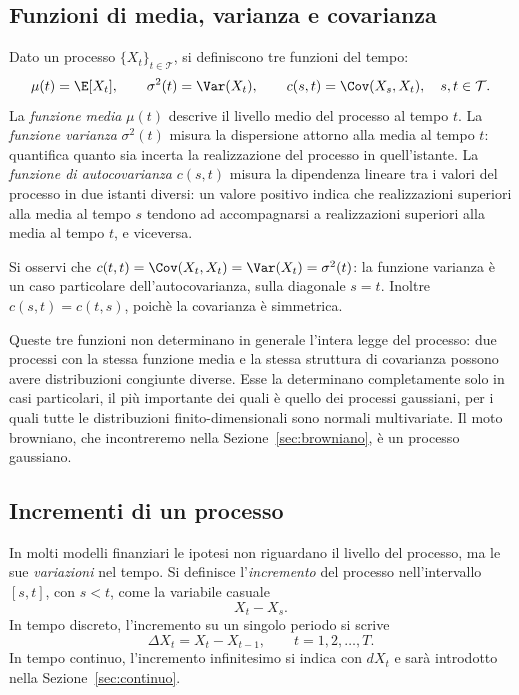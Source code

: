\subsection{Funzioni di media, varianza e covarianza}

\noindent
Dato un processo $\{X_t\}_{t\in\mathcal{T}}$, si definiscono tre
funzioni del tempo:
\[
\mu(t)=\E[X_t], \qquad
\sigma^2(t)=\Var(X_t), \qquad
c(s,t)=\Cov(X_s,X_t), \quad s,t\in\mathcal{T}.
\]
La \emph{funzione media} $\mu(t)$ descrive il livello medio del
processo al tempo $t$. La \emph{funzione varianza} $\sigma^2(t)$
misura la dispersione attorno alla media al tempo $t$: quantifica
quanto sia incerta la realizzazione del processo in quell'istante.
La \emph{funzione di autocovarianza} $c(s,t)$ misura la dipendenza
lineare tra i valori del processo in due istanti diversi: un valore
positivo indica che realizzazioni superiori alla media al tempo $s$
tendono ad accompagnarsi a realizzazioni superiori alla media al
tempo $t$, e viceversa.

Si osservi che $c(t,t)=\Cov(X_t,X_t)=\Var(X_t)=\sigma^2(t)$: la
funzione varianza \`{e} un caso particolare dell'autocovarianza, sulla
diagonale $s=t$. Inoltre $c(s,t)=c(t,s)$, poich\`{e} la covarianza
\`{e} simmetrica.

\begin{remark}
Queste tre funzioni non determinano in generale l'intera legge del
processo: due processi con la stessa funzione media e la stessa
struttura di covarianza possono avere distribuzioni congiunte diverse.
Esse la determinano completamente solo in casi particolari, il
pi\`{u} importante dei quali \`{e} quello dei processi gaussiani, per
i quali tutte le distribuzioni finito-dimensionali sono normali
multivariate. Il moto browniano, che incontreremo nella
Sezione~\ref{sec:browniano}, \`{e} un processo gaussiano.
\end{remark}

\subsection{Incrementi di un processo}

\noindent
In molti modelli finanziari le ipotesi non riguardano il livello del
processo, ma le sue \emph{variazioni} nel tempo. Si definisce
l'\emph{incremento} del processo nell'intervallo $[s,t]$, con $s<t$,
come la variabile casuale
\[
X_t-X_s.
\]
In tempo discreto, l'incremento su un singolo periodo si scrive
\[
\Delta X_t = X_t - X_{t-1}, \qquad t=1,2,\ldots,T.
\]
In tempo continuo, l'incremento infinitesimo si indica con $dX_t$ e
sar\`{a} introdotto nella Sezione~\ref{sec:continuo}.

